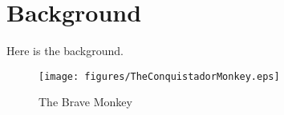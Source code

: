 \chapter{Background} \label{chapter:background}

Here is the background.


\begin{figure}[h]                      
	\centering                             
	\texttt{[image: figures/TheConquistadorMonkey.eps]}
	\caption{The Brave Monkey }
	\label{figConquistador}                         
\end{figure}  
